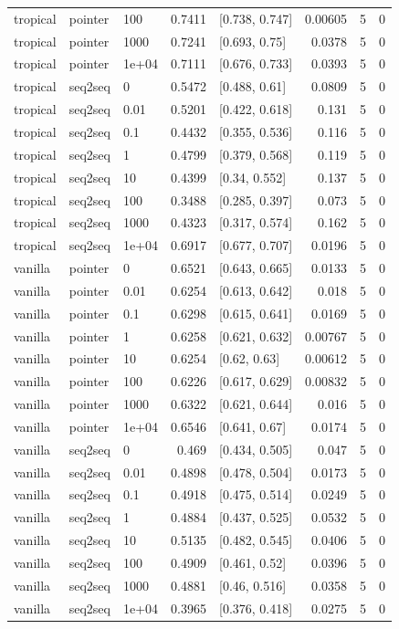 \documentclass[10pt]{article}
\begin{document}
{\begin{longtable}{lllrlrrr}
tropical & pointer & 100 & 0.7411 & [0.738, 0.747] & 0.00605 & 5 & 0\\
tropical & pointer & 1000 & 0.7241 & [0.693, 0.75] & 0.0378 & 5 & 0\\
tropical & pointer & 1e+04 & 0.7111 & [0.676, 0.733] & 0.0393 & 5 & 0\\
tropical & seq2seq & 0 & 0.5472 & [0.488, 0.61] & 0.0809 & 5 & 0\\
tropical & seq2seq & 0.01 & 0.5201 & [0.422, 0.618] & 0.131 & 5 & 0\\
tropical & seq2seq & 0.1 & 0.4432 & [0.355, 0.536] & 0.116 & 5 & 0\\
tropical & seq2seq & 1 & 0.4799 & [0.379, 0.568] & 0.119 & 5 & 0\\
tropical & seq2seq & 10 & 0.4399 & [0.34, 0.552] & 0.137 & 5 & 0\\
tropical & seq2seq & 100 & 0.3488 & [0.285, 0.397] & 0.073 & 5 & 0\\
tropical & seq2seq & 1000 & 0.4323 & [0.317, 0.574] & 0.162 & 5 & 0\\
tropical & seq2seq & 1e+04 & 0.6917 & [0.677, 0.707] & 0.0196 & 5 & 0\\
vanilla & pointer & 0 & 0.6521 & [0.643, 0.665] & 0.0133 & 5 & 0\\
vanilla & pointer & 0.01 & 0.6254 & [0.613, 0.642] & 0.018 & 5 & 0\\
vanilla & pointer & 0.1 & 0.6298 & [0.615, 0.641] & 0.0169 & 5 & 0\\
vanilla & pointer & 1 & 0.6258 & [0.621, 0.632] & 0.00767 & 5 & 0\\
vanilla & pointer & 10 & 0.6254 & [0.62, 0.63] & 0.00612 & 5 & 0\\
vanilla & pointer & 100 & 0.6226 & [0.617, 0.629] & 0.00832 & 5 & 0\\
vanilla & pointer & 1000 & 0.6322 & [0.621, 0.644] & 0.016 & 5 & 0\\
vanilla & pointer & 1e+04 & 0.6546 & [0.641, 0.67] & 0.0174 & 5 & 0\\
vanilla & seq2seq & 0 & 0.469 & [0.434, 0.505] & 0.047 & 5 & 0\\
vanilla & seq2seq & 0.01 & 0.4898 & [0.478, 0.504] & 0.0173 & 5 & 0\\
vanilla & seq2seq & 0.1 & 0.4918 & [0.475, 0.514] & 0.0249 & 5 & 0\\
vanilla & seq2seq & 1 & 0.4884 & [0.437, 0.525] & 0.0532 & 5 & 0\\
vanilla & seq2seq & 10 & 0.5135 & [0.482, 0.545] & 0.0406 & 5 & 0\\
vanilla & seq2seq & 100 & 0.4909 & [0.461, 0.52] & 0.0396 & 5 & 0\\
vanilla & seq2seq & 1000 & 0.4881 & [0.46, 0.516] & 0.0358 & 5 & 0\\
vanilla & seq2seq & 1e+04 & 0.3965 & [0.376, 0.418] & 0.0275 & 5 & 0\\
\bottomrule
\end{longtable}
}
\end{document}
